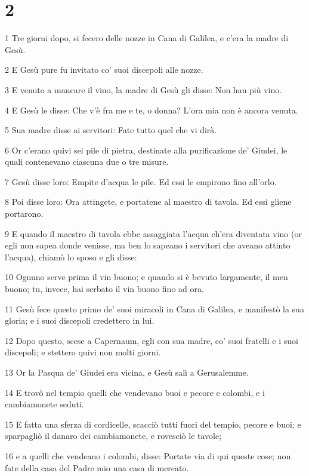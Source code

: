 \chapter{2}

\par 1 Tre giorni dopo, si fecero delle nozze in Cana di Galilea, e c'era la madre di Gesù.
\par 2 E Gesù pure fu invitato co' suoi discepoli alle nozze.
\par 3 E venuto a mancare il vino, la madre di Gesù gli disse: Non han più vino.
\par 4 E Gesù le disse: Che v'è fra me e te, o donna? L'ora mia non è ancora venuta.
\par 5 Sua madre disse ai servitori: Fate tutto quel che vi dirà.
\par 6 Or c'erano quivi sei pile di pietra, destinate alla purificazione de' Giudei, le quali contenevano ciascuna due o tre misure.
\par 7 Gesù disse loro: Empite d'acqua le pile. Ed essi le empirono fino all'orlo.
\par 8 Poi disse loro: Ora attingete, e portatene al maestro di tavola. Ed essi gliene portarono.
\par 9 E quando il maestro di tavola ebbe assaggiata l'acqua ch'era diventata vino (or egli non sapea donde venisse, ma ben lo sapeano i servitori che aveano attinto l'acqua), chiamò lo sposo e gli disse:
\par 10 Ognuno serve prima il vin buono; e quando si è bevuto largamente, il men buono; tu, invece, hai serbato il vin buono fino ad ora.
\par 11 Gesù fece questo primo de' suoi miracoli in Cana di Galilea, e manifestò la sua gloria; e i suoi discepoli credettero in lui.
\par 12 Dopo questo, scese a Capernaum, egli con sua madre, co' suoi fratelli e i suoi discepoli; e stettero quivi non molti giorni.
\par 13 Or la Pasqua de' Giudei era vicina, e Gesù salì a Gerusalemme.
\par 14 E trovò nel tempio quelli che vendevano buoi e pecore e colombi, e i cambiamonete seduti.
\par 15 E fatta una sferza di cordicelle, scacciò tutti fuori del tempio, pecore e buoi; e sparpagliò il danaro dei cambiamonete, e rovesciò le tavole;
\par 16 e a quelli che vendeano i colombi, disse: Portate via di qui queste cose; non fate della casa del Padre mio una casa di mercato.
